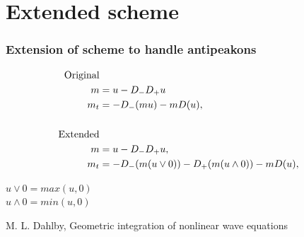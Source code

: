 \documentclass{beamer}
\begin{document}
\section*{Extended scheme}
\begin{frame}
\frametitle{Extension of scheme to handle antipeakons}
\begin{align*}
\text{Original} \\
m &= u - D_- D_+ u \notag \\
m_t &=- D_- ( m u ) - m D ( u ), \\ \\
\text{Extended} \\
m &= u - D_{-}D_{+}u, \notag \\ 
m_t &= -D_{-}(m(u \vee 0)) -D_{+}(m(u \wedge 0)) - mD(u), 
\end{align*}

$u \vee 0 = max(u, 0)$ \\
$u \wedge 0 = min(u, 0) $

\vspace{1cm}
\tiny{M. L. Dahlby, Geometric integration of nonlinear
wave equations}
\end{frame}
\end{document}
